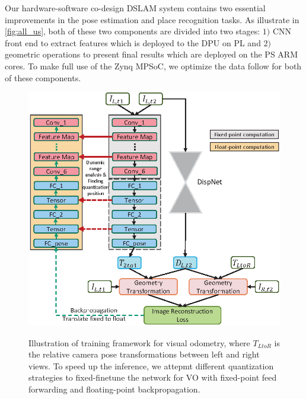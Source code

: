 \label{sec:hardsoft}
Our hardware-software co-design DSLAM system contains two essential improvements in the pose estimation and place recognition tasks. As illustrate in \cref{fig:all_us}, both of these two components are divided into two stages: $1)$ CNN front end to extract features which is deployed to the DPU on PL and $2)$ geometric operations to present final results which are deployed on the PS ARM cores. To make full use of the Zynq MPSoC, we optimize the data follow for both of these components.

\begin{figure}[t]  
    \centering  
    {\includegraphics[width=\linewidth]{fig/depth_vo_feat.eps}\label{fig:dvo}}
    \caption{Illustration of training framework for visual odometry, where $T_{LtoR}$ is the relative camera pose transformations between left and right views. To speed up the inference, we attepmt different quantization strategies to fixed-finetune the network for VO with fixed-point feed forwarding and floating-point backpropagation.}
\end{figure}

